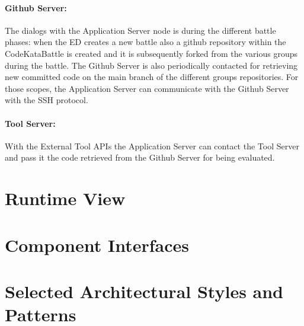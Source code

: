\paragraph{Github Server: }
The dialogs with the Application Server node is during the different battle phases: when the ED creates a new battle also a github repository within the CodeKataBattle is created and it is subsequently forked from the various groups during the battle.
The Github Server is also periodically contacted for retrieving new committed code on the main branch of the different groups repositories.
For those scopes, the Application Server can communicate with the Github Server with the SSH protocol.


\paragraph{Tool Server: }
With the External Tool APIs the Application Server can contact the Tool Server and pass it the code retrieved from the Github Server for being evaluated.


\section{Runtime View}
\label{sec:runtime_view}%

\section{Component Interfaces}
\label{sec:component_interfaces}%

\section{Selected Architectural Styles and Patterns}
\label{sec:selected_Srchitectural_styles_patterns}%

